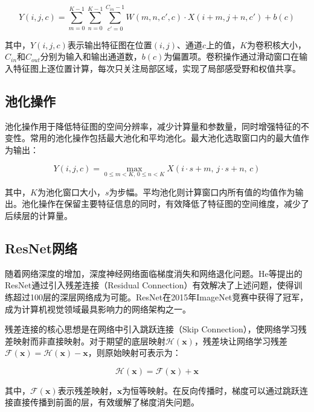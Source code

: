 \begin{equation}
	Y(i,j,c) = \sum_{m=0}^{K-1}\sum_{n=0}^{K-1}\sum_{c'=0}^{C_{in}-1} W(m,n,c',c) \cdot X(i+m, j+n, c') + b(c)
	\label{eq:convolution}
\end{equation}

其中，$Y(i,j,c)$表示输出特征图在位置$(i,j)$、通道$c$上的值，$K$为卷积核大小，$C_{in}$和$C_{out}$分别为输入和输出通道数，$b(c)$为偏置项。卷积操作通过滑动窗口在输入特征图上逐位置计算，每次只关注局部区域，实现了局部感受野和权值共享。

\subsection{池化操作}

池化操作用于降低特征图的空间分辨率，减少计算量和参数量，同时增强特征的不变性。常用的池化操作包括最大池化和平均池化。最大池化选取窗口内的最大值作为输出：

\begin{equation}
	Y(i,j,c) = \max_{0 \le m < K, \, 0 \le n < K} X(i \cdot s + m, \, j \cdot s + n, \, c)
	\label{eq:max_pooling}
\end{equation}

其中，$K$为池化窗口大小，$s$为步幅。平均池化则计算窗口内所有值的均值作为输出。池化操作在保留主要特征信息的同时，有效降低了特征图的空间维度，减少了后续层的计算量。

\subsection{ResNet网络}

随着网络深度的增加，深度神经网络面临梯度消失和网络退化问题。He等\cite{he2016deep}提出的ResNet通过引入残差连接（Residual Connection）有效解决了上述问题，使得训练超过100层的深层网络成为可能。ResNet在2015年ImageNet竞赛中获得了冠军，成为计算机视觉领域最具影响力的网络架构之一。

残差连接的核心思想是在网络中引入跳跃连接（Skip Connection），使网络学习残差映射而非直接映射。对于期望的底层映射$\mathcal{H}(\mathbf{x})$，残差块让网络学习残差$\mathcal{F}(\mathbf{x}) = \mathcal{H}(\mathbf{x}) - \mathbf{x}$，则原始映射可表示为：

\begin{equation}
	\mathcal{H}(\mathbf{x}) = \mathcal{F}(\mathbf{x}) + \mathbf{x}
	\label{eq:residual}
\end{equation}

其中，$\mathcal{F}(\mathbf{x})$表示残差映射，$\mathbf{x}$为恒等映射。在反向传播时，梯度可以通过跳跃连接直接传播到前面的层，有效缓解了梯度消失问题。

